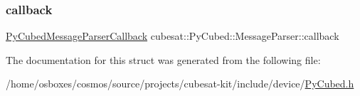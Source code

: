 \subsubsection{\texorpdfstring{callback}{callback}}
{\footnotesize\ttfamily \hyperlink{namespacecubesat_ad7197c1bfb09998ced84827cb0dd1680}{Py\+Cubed\+Message\+Parser\+Callback} cubesat\+::\+Py\+Cubed\+::\+Message\+Parser\+::callback}



The documentation for this struct was generated from the following file\+:\begin{DoxyCompactItemize}
\item 
/home/osboxes/cosmos/source/projects/cubesat-\/kit/include/device/\hyperlink{PyCubed_8h}{Py\+Cubed.\+h}\end{DoxyCompactItemize}

